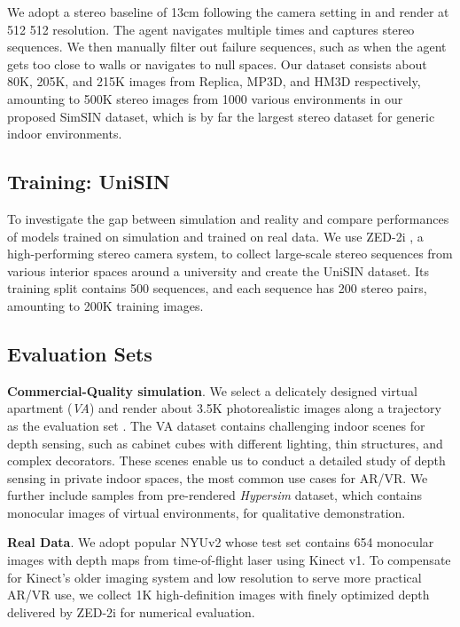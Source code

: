 \documentclass[10pt,twocolumn,letterpaper]{article}
\begin{document}
We adopt a stereo baseline of 13cm following the camera setting in \cite{chabra2019stereodrnet} and render at 512  512 resolution. The agent navigates multiple times and captures stereo sequences. We then manually filter out failure sequences, such as when the agent gets too close to walls or navigates to null spaces. Our dataset consists about 80K, 205K, and 215K images from Replica, MP3D, and HM3D respectively, amounting to 500K stereo images from 1000 various environments in our proposed SimSIN dataset, which is by far the largest stereo dataset for generic indoor environments.

\subsection{Training: UniSIN}
\label{sec:UniSIN}
To investigate the gap between simulation and reality and compare performances of models trained on simulation and trained on real data. We use ZED-2i \cite{ZED2i}, a high-performing stereo camera system, to collect large-scale stereo sequences from various interior spaces around a university and create the UniSIN dataset. Its training split contains 500 sequences, and each sequence has 200 stereo pairs, amounting to 200K training images.

\subsection{Evaluation Sets}
\label{sec:evaluation}
\textbf{Commercial-Quality simulation}. We select a delicately designed virtual apartment (\textit{VA}) and render about 3.5K photorealistic images along a trajectory as the evaluation set \cite{UnrealEngine4, UE4Environment}. The VA dataset contains challenging indoor scenes for depth sensing, such as cabinet cubes with different lighting, thin structures, and complex decorators. These scenes enable us to conduct a detailed study of depth sensing in private indoor spaces, the most common use cases for AR/VR. We further include samples from pre-rendered \textit{Hypersim} \cite{roberts2020hypersim} dataset, which contains monocular images of virtual environments, for qualitative demonstration.

\textbf{Real Data}.
We adopt popular NYUv2 \cite{silberman2012indoor} whose test set contains 654 monocular images with depth maps from time-of-flight laser using Kinect v1. To compensate for Kinect's older imaging system and low resolution to serve more practical AR/VR use, we collect 1K high-definition images with finely optimized depth delivered by ZED-2i for numerical evaluation.
\end{document}
